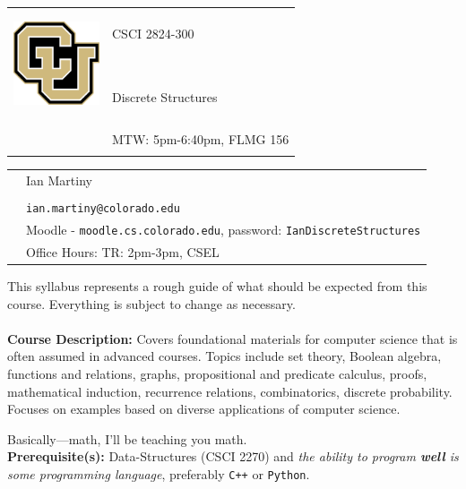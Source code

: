 \documentclass[11pt]{article}
\begin{document}
\begin{tabular}{ l l }
  \multirow{3}{*}{\includegraphics[height=1.25in,width=1in]{cuboulder-large.png}} & \LARGE CSCI 2824-300\\\\
  & \LARGE Discrete Structures\\\\
  & \LARGE MTW: 5pm-6:40pm, FLMG 156 \\\\
\end{tabular}
\vspace{10mm}

\begin{tabular}{ l l }
  & \large Ian Martiny\\\\
  & \large \texttt{ian.martiny@colorado.edu}\\
  & \large Moodle - \texttt{moodle.cs.colorado.edu}, password: \texttt{IanDiscreteStructures}\\
  & \large Office Hours: TR: 2pm-3pm, CSEL\\
\end{tabular}

\vspace{5mm}
This syllabus represents a rough guide of what should be expected from this course. Everything is subject to change as necessary. \\


\textbf {\large \\ Course Description:} Covers foundational materials for computer science that is often assumed in advanced courses. Topics include set theory, Boolean algebra, functions and relations, graphs, propositional and predicate calculus, proofs, mathematical induction, recurrence relations, combinatorics, discrete probability. Focuses on examples based on diverse applications of computer science. 

Basically---math, I'll be teaching you math.\\
\textbf {Prerequisite(s):} Data-Structures (CSCI 2270) and \emph{the ability to program {\bf well} is some programming language}, preferably \texttt{C++} or \texttt{Python}.
\end{document}
